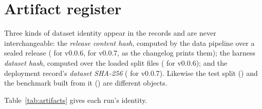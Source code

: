 \section{Artifact register}\label{app:artifacts}
Three kinds of dataset identity appear in the records and are never interchangeable: the \emph{release content hash}, computed by the data pipeline over a sealed release ( for v0.0.6,  for v0.0.7, as the changelog prints them); the harness \emph{dataset hash}, computed over the loaded split files ( for v0.0.6); and the deployment record's \emph{dataset SHA-256} ( for v0.0.7). Likewise the test split () and the benchmark built from it () are different objects.

Table~\ref{tab:artifacts} gives each run's identity.

